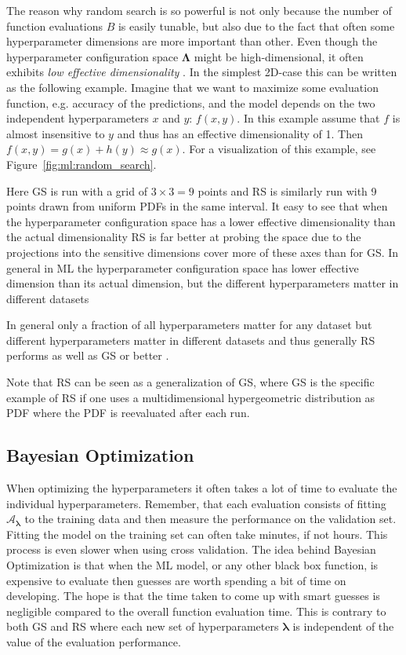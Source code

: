 The reason why random search is so powerful is not only because the number of function evaluations $B$ is easily tunable, but also due to the fact that often some hyperparameter dimensions are more important than other. Even though the hyperparameter configuration space $\bm{\Lambda}$  might be high-dimensional, it often exhibits \emph{low effective dimensionality} \autocite{bergstraRandomSearchHyperparameter2012}. In the simplest 2D-case this can be written as the following example. Imagine that we want to maximize some evaluation function, e.g. accuracy of the predictions, and the model depends on the two independent hyperparameters $x$ and $y$: $f(x, y)$. In this example assume that $f$ is almost insensitive to $y$ and thus has an effective dimensionality of 1. Then $f(x,y) = g(x) + h(y) \approx g(x)$. For a visualization of this example, see Figure~\ref{fig:ml:random_search}.

Here GS is run with a grid of $3\times3 = 9$ points and RS is similarly run with 9 points drawn from uniform PDFs in the same interval. It easy to see that when the hyperparameter configuration space has a lower effective dimensionality than the actual dimensionality RS is far better at probing the space due to the projections into the sensitive dimensions cover more of these axes than for GS. In general in ML the hyperparameter configuration space has lower effective dimension than its actual dimension, but the different hyperparameters matter in different datasets

In general only a fraction of all hyperparameters matter for any dataset but different hyperparameters matter in different datasets and thus generally RS performs as well as GS or better \autocite{bergstraRandomSearchHyperparameter2012}. 

Note that RS can be seen as a generalization of GS, where GS is the specific example of RS if one uses a multidimensional hypergeometric distribution as PDF where the PDF is reevaluated after each run. 

\subsection{Bayesian Optimization}
\label{subsec:ml:bayesian_optimization}
When optimizing the hyperparameters it often takes a lot of time to evaluate the individual hyperparameters. Remember, that each evaluation consists of fitting $\mathcal{A}_{\bm{\lambda}}$ to the training data and then measure the performance on the validation set. Fitting the model on the training set can often take minutes, if not hours. This process is even slower when using cross validation. The idea behind Bayesian Optimization is that when the ML model, or any other black box function, is expensive to evaluate then  guesses are worth spending a bit of time on developing. The hope is that the time taken to come up with smart guesses is negligible compared to the overall function evaluation time. This is contrary to both GS and RS where each new set of hyperparameters $\bm{\lambda}$ is independent of the value of the evaluation performance.

